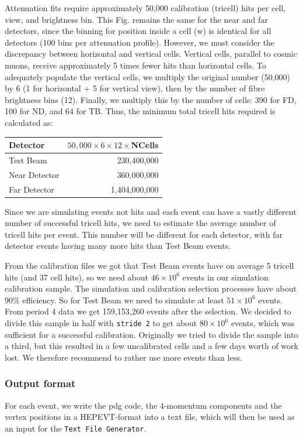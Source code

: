 \documentclass[12pt]{article}
\begin{document}
Attenuation fits require approximately 50,000 calibration (tricell) hits per cell, view, and brightness bin. This Fig. remains the same for the near and far detectors, since the binning for position inside a cell (w) is identical for all detectors (100 bins per attenuation profile). However, we must consider the discrepancy between horizontal and vertical cells. Vertical cells, parallel to cosmic muons, receive approximately 5 times fewer hits than horizontal cells. To adequately populate the vertical cells, we multiply the original number (50,000) by 6 (1 for horizontal + 5 for vertical view), then by the number of fibre brightness bins (12). Finally, we multiply this by the number of cells: 390 for FD, 100 for ND, and 64 for TB. Thus, the minimum total tricell hits required is calculated as:
\begin{center}
\begin{tabular}{lr}
Detector & $50,000\times 6\times 12\times$NCells\\\hline
Test Beam & 230,400,000\\
Near Detector & 360,000,000\\
Far Detector & 1,404,000,000
\end{tabular}
\end{center}

Since we are simulating events not hits and each event can have a vastly different number of successful tricell hits, we need to estimate the average number of tricell hits per event. This number will be different for each detector, with far detector events having many more hits than Test Beam events.

From the calibration files we got that Test Beam events have on average 5 tricell hits (and 37 cell hits), so we need about $46\times10^6$ events in our simulation calibration sample. The simulation and calibration selection processes have about 90\% efficiency. So for Test Beam we need to simulate at least $51\times10^6$ events. From period 4 data we get 159,153,260 events after the selection. We decided to divide this sample in half with \texttt{stride 2} to get about $80\times10^6$ events, which was sufficient for a successful calibration. Originally we tried to divide the sample into a third, but this resulted in a few uncalibrated cells and a few days worth of work lost. We therefore recommend to rather use more events than less.

\subsubsection{Output format}\label{secHEPEVTFormat}
For each event, we write the pdg code, the 4-momentum components and the vertex positions in a HEPEVT-format \cite{HEPEVTFormat} into a text file, which will then be used as an input for the \texttt{Text File Generator}.
\end{document}
